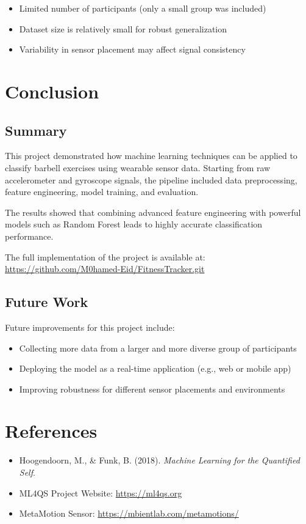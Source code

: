 \documentclass[12pt,a4paper]{article}
\begin{document}
\begin{itemize}
\item Limited number of participants (only a small group was included)
\item Dataset size is relatively small for robust generalization
\item Variability in sensor placement may affect signal consistency
\end{itemize}

\section{Conclusion}

\subsection{Summary}

This project demonstrated how machine learning techniques can be applied to classify barbell exercises using wearable sensor data. Starting from raw accelerometer and gyroscope signals, the pipeline included data preprocessing, feature engineering, model training, and evaluation.

The results showed that combining advanced feature engineering with powerful models such as Random Forest leads to highly accurate classification performance.

The full implementation of the project is available at:  
\url{https://github.com/M0hamed-Eid/FitnessTracker.git}

\subsection{Future Work}

Future improvements for this project include:

\begin{itemize}
\item Collecting more data from a larger and more diverse group of participants
\item Deploying the model as a real-time application (e.g., web or mobile app)
\item Improving robustness for different sensor placements and environments
\end{itemize}

\section{References}

\begin{itemize}
\item Hoogendoorn, M., \& Funk, B. (2018). \textit{Machine Learning for the Quantified Self}.
\item ML4QS Project Website: \url{https://ml4qs.org}
\item MetaMotion Sensor: \url{https://mbientlab.com/metamotions/}
\end{itemize}

\end{document}
